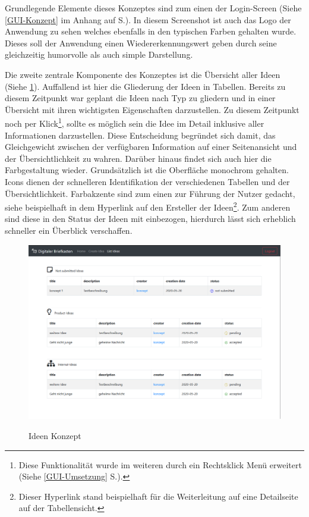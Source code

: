 Grundlegende Elemente dieses Konzeptes sind zum einen der Login-Screen (Siehe \ref{GUI-Konzept} im Anhang auf S.\pageref{GUI-Konzept}).
In diesem Screenshot ist auch das Logo der Anwendung zu sehen welches ebenfalls in den typischen Farben gehalten wurde. Dieses soll der Anwendung einen Wiedererkennungswert geben durch seine gleichzeitig humorvolle als auch simple Darstellung.

Die zweite zentrale Komponente des Konzeptes ist die Übersicht aller Ideen (Siehe \cref{fig:ideen}).
Auffallend ist hier die Gliederung der Ideen in Tabellen. Bereits zu diesem Zeitpunkt war geplant die Ideen nach Typ zu gliedern und in einer Übersicht mit ihren wichtigsten Eigenschaften darzustellen.
Zu diesem Zeitpunkt noch per Klick\footnote{Diese Funktionalität wurde im weiteren durch ein Rechtsklick Menü erweitert (Siehe \ref{GUI-Umsetzung} S.\pageref{GUI-Umsetzung}).}, sollte es möglich sein die Idee im Detail inklusive aller Informationen darzustellen. Diese Entscheidung begründet sich damit, das Gleichgewicht zwischen der verfügbaren Information auf einer Seitenansicht und der Übersichtlichkeit zu wahren.
Darüber hinaus findet sich auch hier die Farbgestaltung wieder. Grundsätzlich ist die Oberfläche monochrom gehalten. Icons dienen der schnelleren Identifikation der verschiedenen Tabellen und der Übersichtlichkeit. Farbakzente sind zum einen zur Führung der Nutzer gedacht, siehe beispielhaft in dem Hyperlink auf den Ersteller der Ideen\footnote{Dieser Hyperlink stand beispielhaft für die Weiterleitung auf eine Detailseite auf der Tabellensicht.}. Zum anderen sind diese in den Status der Ideen mit einbezogen, hierdurch lässt sich erheblich schneller ein Überblick verschaffen.

\begin{figure}[hbt]
    \centering
    \begin{minipage}[t]{1\textwidth}
        \caption{Ideen Konzept}
        \includegraphics[width=1\textwidth]{img/ideen-Konzept.png}\\
        \label{fig:ideen}
    \end{minipage}
\end{figure}

